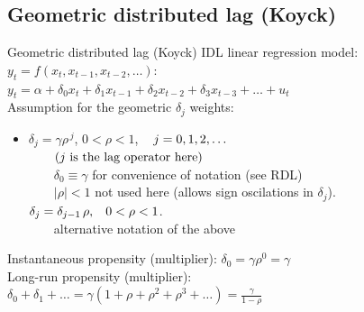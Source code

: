\documentclass{beamer}
\begin{document}
\subsection{Geometric distributed lag (Koyck) }
\begin{frame}{Geometric distributed lag (Koyck) }
IDL linear regression model: $y_t = f(x_t, x_{t-1}, x_{t-2}, \dots)$: 
\\ \vspace{0.3cm}
$ y_t = \alpha + \delta_0 x_t + \delta_1 x_{t-1} + \delta_2 x_{t-2} + \delta_3 x_{t-3} 
+ \dots + u_t$ \\ \vspace{0.3cm}
Assumption for the geometric $\delta_j$ weights:
\begin{itemize}
\item $ \delta_{j} = \gamma \rho^{\,j}$, \hspace{0.3cm} $0 < \rho < 1 $, $\hspace{0.3cm} j=0,1,2,\dots $\\
\smallskip
~~~~$\left( j \textnormal{~is the lag operator here} \right)$\\
~~~~$\delta_0 \equiv \gamma$ for convenience of notation (see RDL)\\
~~~~$|\rho|<1$ not used here (allows sign oscilations in $ \delta_{j}$).\\
\smallskip
$\delta_j = \delta_{j-1}\, \rho, \hspace{0.3cm} 0 < \rho < 1 $.\\
~~~~alternative notation of the above 
\end{itemize}
\vspace{0.3cm}
Instantaneous propensity (multiplier): $ \delta_0 = \gamma \rho^0 = \gamma$ 
\\ \vspace{0.3cm}
Long-run propensity (multiplier):
\\ \vspace{0.3cm}
$\delta_0+\delta_1+\dots=\gamma(1+\rho+\rho^2+\rho^3+\dots)=\frac{\gamma}{1-\rho}$
\end{frame}
\end{document}
